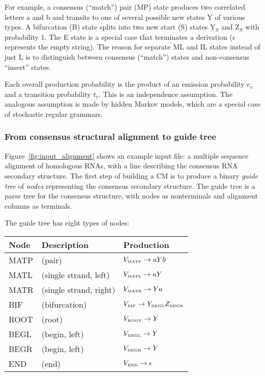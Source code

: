 \documentclass[11pt]{article}
\begin{document}
For example, a consensus (``match'') pair (MP) state produces two
correlated letters a and b and transits to one of several possible new
states Y of various types.  A bifurcation (B) state splits into two
new start (S) states Y$_{S}$ and Z$_{S}$ with probability 1.  The E
state is a special case that terminates a derivation ($\epsilon$
represents the empty string). The reason for separate ML and IL states
instead of just L is to distinguish between consensus (``match'')
states and non-consensus ``insert'' states.

Each overall production probability is the product of an emission
probability $e_v$ and a transition probability $t_v$. This is an
independence assumption. The analogous assumption is made by hidden
Markov models, which are a special case of stochastic regular
grammars.

\subsubsection{From consensus structural alignment to guide tree}

Figure~\ref{fig:input_alignment} shows an example input file: a
multiple sequence alignment of homologous RNAs, with a line describing
the consensus RNA secondary structure. The first step of building a CM
is to produce a binary \emph{guide tree} of \emph{nodes} representing
the consensus secondary structure. The guide tree is a parse tree for
the consensus structure, with nodes as nonterminals and alignment
columns as terminals.

The guide tree has eight types of nodes:

\begin{tabular}{lll}
Node      & Description      &  Production           \\ \hline
MATP  & (pair)                 & $V_{\mbox{\tiny MATP}} \rightarrow a Y b$  \\
MATL  & (single strand, left)  & $V_{\mbox{\tiny MATL}} \rightarrow a Y$   \\
MATR  & (single strand, right) & $V_{\mbox{\tiny MATR}} \rightarrow Y a$   \\
BIF   & (bifurcation)          & $V_{\mbox{\tiny BIF}}  \rightarrow
Y_{\mbox{\tiny BEGL}} Z_{\mbox{\tiny BEGR}}$ \\
ROOT  & (root)                 & $V_{\mbox{\tiny ROOT}} \rightarrow Y$       \\
BEGL  & (begin, left)          & $V_{\mbox{\tiny BEGL}} \rightarrow Y$       \\
BEGR  & (begin, left)          & $V_{\mbox{\tiny BEGR}} \rightarrow Y$       \\
END   & (end)                  & $V_{\mbox{\tiny END}}  \rightarrow \epsilon$ \\ \hline
\end{tabular}
 
\end{document}
